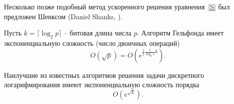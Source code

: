 Несколько позже подобный метод ускоренного решения уравнения~\ref{S} был предложен Шенксом (Daniel Shanks, \cite{Shanks:1971}).

Пусть $k = \lceil \log_2 p \rceil$ -- битовая длина числа $p$. Алгоритм Гельфонда имеет экспоненциальную сложность (число двоичных операций)
    \[ O(\sqrt{p}) = O(e^{\frac{1}{2} \frac{1}{\log_2 e} k}). \]

Наилучшие из известных алгоритмов решения задачи дискретного логарифмирования имеют экспоненциальную сложность порядка
    \[ O(e^{\sqrt{k}}). \]

